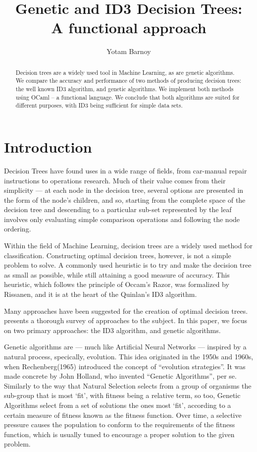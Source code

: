 \documentclass[12pt, letterpaper]{article}
\title{Genetic and ID3 Decision Trees:\\ A functional approach}
\author{Yotam Barnoy}
\begin{document}
\maketitle

\begin{abstract}
Decision trees are a widely used tool in Machine Learning, as are genetic algorithms. We compare the accuracy and performance of two methods of producing decision trees: the well known ID3 algorithm, and genetic algorithms. We implement both methods using OCaml -- a functional language. We conclude that both algorithms are suited for different purposes, with ID3 being sufficient for simple data sets.

\end{abstract}

\section{Introduction}
Decision Trees have found uses in a wide range of fields, from car-manual repair instructions to operations research. Much of their value comes from their simplicity --- at each node in the decision tree, several options are presented in the form of the node's children, and so, starting from the complete space of the decision tree and descending to a particular sub-set represented by the leaf involves only evaluating simple comparison operations and following the node ordering.

Within the field of Machine Learning, decision trees are a widely used method for classification\cite{tomMitchellML}. Constructing optimal decision trees, however, is not a simple problem to solve\cite{decisionTreesNPComplete}. A commonly used heuristic is to try and make the decision tree as small as possible, while still attaining a good measure of accuracy. This heuristic, which follows the principle of Occam's Razor, was formalized by Rissanen\cite{rissanen1978modeling}, and it is at the heart of the Quinlan's ID3 algorithm\cite{quinlan1986induction}.

Many approaches have been suggested for the creation of optimal decision trees. \cite{safavian1991survey} presents a thorough survey of approaches to the subject. In this paper, we focus on two primary approaches: the ID3 algorithm, and genetic algorithms.

Genetic algorithms are --- much like Artificial Neural Networks --- inspired by a natural process, specically, evolution. This idea originated in the 1950s and 1960s, when Rechenberg(1965) introduced the concept of ``evolution strategies''\cite{melanie1999introduction}. It was made concrete by John Holland, who invented ``Genetic Algorithms'', per se\cite{holland197388}. Similarly to the way that Natural Selection selects from a group of organisms the sub-group that is most `fit', with fitness being a relative term, so too, Genetic Algorithms select from a set of solutions the ones most `fit', according to a certain measure of fitness known as the fitness function. Over time, a selective pressure causes the population to conform to the requirements of the fitness function, which is usually tuned to encourage a proper solution to the given problem.
\end{document}
